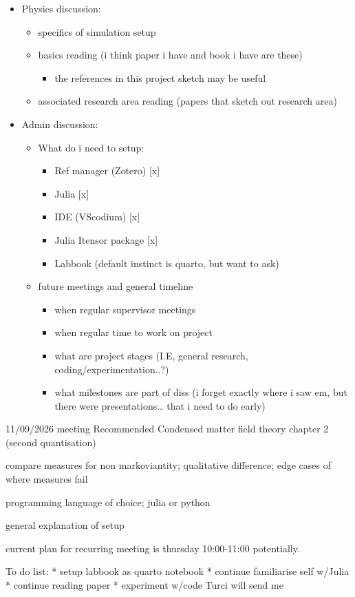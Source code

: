 \documentclass[
  letterpaper,
  DIV=11,
  numbers=noendperiod]{scrartcl}
\providecommand{\tightlist}{%
  \setlength{\itemsep}{0pt}\setlength{\parskip}{0pt}}
\begin{document}
\begin{itemize}
\tightlist
\item
  Physics discussion:

  \begin{itemize}
  \tightlist
  \item
    specifics of simulation setup
  \item
    basics reading (i think paper i have and book i have are these)

    \begin{itemize}
    \tightlist
    \item
      the references in this project sketch may be useful
    \end{itemize}
  \item
    associated research area reading (papers that sketch out research
    area)
  \end{itemize}
\item
  Admin discussion:

  \begin{itemize}
  \tightlist
  \item
    What do i need to setup:

    \begin{itemize}
    \tightlist
    \item
      Ref manager (Zotero) {[}x{]}
    \item
      Julia {[}x{]}
    \item
      IDE (VScodium) {[}x{]}
    \item
      Julia Itensor package {[}x{]}
    \item
      Labbook (default instinct is quarto, but want to ask)
    \end{itemize}
  \item
    future meetings and general timeline

    \begin{itemize}
    \tightlist
    \item
      when regular supervisor meetings
    \item
      when regular time to work on project
    \item
      what are project stages (I.E, general research,
      coding/experimentation..?)
    \item
      what milestones are part of diss (i forget exactly where i saw em,
      but there were presentations\ldots{} that i need to do early)
    \end{itemize}
  \end{itemize}
\end{itemize}

11/09/2026 meeting Recommended Condensed matter field theory chapter 2
(second quantisation)

compare measures for non markoviantity; qualitative difference; edge
cases of where measures fail

programming language of choice; julia or python

general explanation of setup

current plan for recurring meeting is thursday 10:00-11:00 potentially.

To do list: * setup labbook as quarto notebook * continue familiarise
self w/Julia * continue reading paper * experiment w/code Turci will
send me
\end{document}
